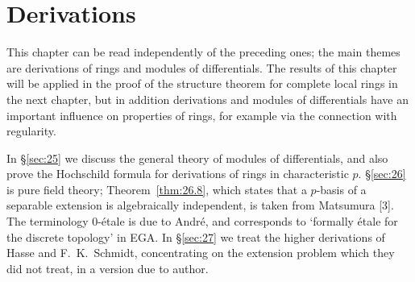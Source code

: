 \chapter{Derivations}\label{ch:9}

This chapter can be read independently of the preceding ones; the main
themes are derivations of rings and modules of differentials. The results
of this chapter will be applied in the proof of the structure theorem for
complete local rings in the next chapter, but in addition derivations and
modules of differentials have an important influence on properties of rings,
for example via the connection with regularity.

In \S\ref{sec:25} we discuss the general theory of modules of differentials, and
also prove the Hochschild formula for derivations of rings in characteristic
$p$. \S\ref{sec:26} is pure field theory; Theorem~\ref{thm:26.8}, which states that a
$p$-basis of a separable extension is algebraically independent, is taken from
Matsumura [3]. The terminology 0-\'etale is due to Andr\'e, and corresponds
to `formally \'etale for the discrete topology' in EGA. In \S\ref{sec:27} we treat the
higher derivations of Hasse and F.~K.~Schmidt, concentrating on the
extension problem which they did not treat, in a version due to author.




